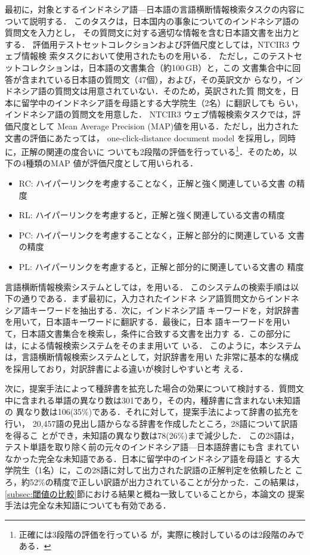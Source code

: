 \documentclass[japanese]{jnlp_1.4}
\begin{document}
最初に，対象とするインドネシア語—日本語の言語横断情報検索タスクの内容に
ついて説明する．
このタスクは，日本国内の事象についてのインドネシア語の質問文を入力とし，
その質問文に対する適切な情報を含む日本語文書を出力とする．
評価用テストセットコレクションおよび評価尺度としては，NTCIR3 ウェブ情報検
索タスク\cite{eguchi_NTCIR3}において使用されたものを用いる．
ただし，このテストセットコレクションは，日本語の文書集合（約100\,GB）と，この
文書集合中に回答が含まれている日本語の質問文（47個），および，その英訳文か
らなり，インドネシア語の質問文は用意されていない．そのため，英訳された質
問文を，日本に留学中のインドネシア語を母語とする大学院生（2名）に翻訳しても
らい，インドネシア語の質問文を用意した．
NTCIR3 ウェブ情報検索タスクでは，評価尺度として Mean Average Precision
(MAP)値を用いる．ただし，出力された文書の評価にあたっては，
one-click-distance document model を採用し，同時に，正解の関連の度合いに
ついても2段階の評価を行っている\footnote{正確には3段階の評価を行っている
が，実際に検討しているのは2段階のみである．}．そのため，以下の4種類のMAP
値が評価尺度として用いられる．
\begin{itemize}
  \item RC: ハイパーリンクを考慮することなく，正解と強く関連している文書
	の精度
  \item RL: ハイパーリンクを考慮すると，正解と強く関連している文書の精度
  \item PC: ハイパーリンクを考慮することなく，正解と部分的に関連している
	文書の精度
  \item PL: ハイパーリンクを考慮すると，正解と部分的に関連している文書の
	精度
\end{itemize}

言語横断情報検索システムとしては，\cite{IJCLIR}を用いる．
このシステムの検索手順は以下の通りである．まず最初に，入力されたインドネ
シア語質問文からインドネシア語キーワードを抽出する．次に，インドネシア語
キーワードを，対訳辞書を用いて，日本語キーワードに翻訳する．最後に，日本
語キーワードを用いて，日本語文書集合を検索し，条件に合致する文書を出力す
る．この部分には，\cite{fujii03b}による情報検索システムをそのまま用いて
いる．
このように，本システムは，言語横断情報検索システムとして，対訳辞書を用い
た非常に基本的な構成を採用しており，対訳辞書による違いが検討しやすいと考
える．

次に，提案手法によって種辞書を拡充した場合の効果について検討する．質問文
中に含まれる単語の異なり数は301であり，その内，種辞書に含まれない未知語の
異なり数は106(35\%)である．それに対して，提案手法によって辞書の拡充を行い，
20,457語の見出し語からなる辞書を作成したところ，28語について訳語を得るこ
とができ，未知語の異なり数は78(26\%)まで減少した．
この28語は，テスト単語を取り除く前の元々のインドネシア語—日本語辞書にも含
まれていなかった完全な未知語である．日本に留学中のインドネシア語を母語と
する大学院生（1名）に，この28語に対して出力された訳語の正解判定を依頼したと
ころ，約52\%の精度で正しい訳語が出力されていることが分かった．この結果は，
\ref{subsec:閾値の比較}節における結果と概ね一致していることから，本論文の
提案手法は完全な未知語についても有効である．
\end{document}
